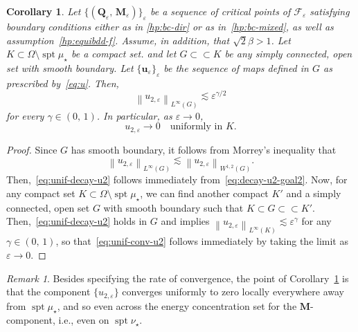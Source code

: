 \documentclass[a4paper, 11pt, twoside, leqno]{article}
\newtheorem{corollary}[theorem]{Corollary}
\theoremstyle{definition}              %
\theoremstyle{remark}                  %
\newtheorem{remark}{Remark}
\DeclareMathOperator{\spt}{spt}                                     %
\newcommand{\norm}[1]{\left\| #1 \right\|}                          %
\newcommand{\csubset}{\subset\!\subset}                             %
\newcommand{\Q}{\mathbf{Q}}
\newcommand{\M}{\mathbf{M}}
\renewcommand{\u}{\mathbf{u}}
\newcommand{\F}{\mathscr{F}}
\newcommand{\eps}{\varepsilon}
\begin{document}
\begin{corollary}\label{cor:unif-conv-u2}
	Let $\{(\Q_\eps,\,\M_\eps)\}_\eps$ be a sequence of critical points of 
	$\F_\eps$ satisfying boundary conditions either as in \eqref{hp:bc-dir} or as 
	in~\eqref{hp:bc-mixed}, as well as assumption~\eqref{hp:equibdd-f}. 
    Assume, in addition, that $\sqrt{2}\beta > 1$. 
    Let $K \subset \Omega \setminus \spt\mu_\star$ be a compact set.  
    and let $G \csubset K$ be any simply connected, open set with smooth boundary.   
    Let $\{\u_\eps\}_\eps$ be the sequence of maps defined in $G$ as prescribed by~\eqref{eq:u}. Then,
    \begin{equation}\label{eq:unif-decay-u2}
    	\norm{u_{2,\eps}}_{L^\infty(G)} \lesssim \eps^{\gamma/2}
    \end{equation}
    for every $\gamma \in (0,\,1)$. In particular, as $\eps \to 0$, 
    \begin{equation}\label{eq:unif-conv-u2}
    	u_{2,\eps} \to 0 \quad \mbox{uniformly in } K.
    \end{equation}
\end{corollary}

\begin{proof}
	Since $G$ has smooth boundary, it follows from Morrey's inequality 
	that
	\[
		\norm{u_{2,\eps}}_{L^\infty(G)} \lesssim \norm{u_{2,\eps}}_{W^{1,2}(G)}. 
	\]
	Then,~\eqref{eq:unif-decay-u2} follows immediately from~\eqref{eq:decay-u2-goal2}. 
	Now, for any compact set 
	$K \subset \Omega \setminus \spt\mu_\star$, we can find another compact 
	$K'$ and a simply connected, open set $G$ with smooth boundary such 
	that $K \subset G \csubset K'$. Then,~\eqref{eq:unif-decay-u2} holds 
	in $G$ and implies $\norm{u_{2,\eps}}_{L^\infty(K)} \lesssim \eps^{\gamma}$ for 
	any $\gamma \in (0,\,1)$, so that~\eqref{eq:unif-conv-u2} follows 
	immediately by taking the limit as $\eps \to 0$. 
\end{proof}


\begin{remark}
	Besides specifying the rate of convergence, the point 
	of Corollary~\ref{cor:unif-conv-u2} is that the component 
	$\{u_{2,\eps}\}$ converges uniformly to zero locally everywhere 
	away from $\spt \mu_\star$, and so even across 
	the energy concentration set for the $\M$-component, i.e., 
	even on $\spt \nu_\star$.
\end{remark}
\end{document}
